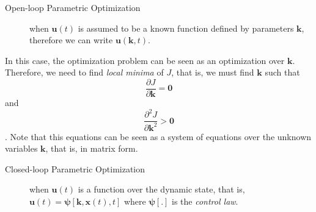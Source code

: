 \begin{description}
    \item[Open-loop Parametric Optimization] when $\bm{u}(t)$ is assumed to be a known function defined by parameters $\bm{k}$, therefore we can write $\bm{u}(\bm{k},t)$.
\end{description}

In this case, the optimization problem can be seen as an optimization over $\bm{k}$. Therefore, we need to find \emph{local minima} of $J$, that is, we must find $\bm{k}$ such that \[
    \frac{\partial J}{\partial \bm{k}}=\bm{0}
\] and \[
\frac{\partial^{2}J}{\partial \bm{k}^{2}}>\bm{0}
\]. Note that this equations can be seen as a system of equations over the unknown variables $\bm{k}$, that is, in matrix form.

\begin{description}
    \item[Closed-loop Parametric Optimization] when  $\bm{u}(t)$ is a function over the dynamic state, that is, $\bm{u}(t) = \bm{\psi}[\bm{k},\bm{x}(t),t]$ where $\bm{\psi}[.]$ is the \emph{control law}.
\end{description}
